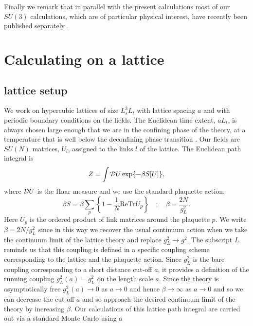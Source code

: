 \documentclass[12pt]{article}
\begin{document}
Finally we remark that in parallel with the present calculations most of our $SU(3)$
calculations, which are of particular physical interest, have recently been published
separately 
%
\cite{AAMT-2020}.
%



%
%
%
%
\section{Calculating on a lattice}
\label{section_lattice} 

%
%
\subsection{lattice setup}
\label{subsection_lattice_setup}


We work on hypercubic lattices of size $L_s^3L_t$ with lattice spacing $a$ and with
periodic boundary conditions on the fields. The Euclidean time extent, $aL_t$, is
always chosen large enough that we are in the confining phase of the theory, at a
temperature that is well below the deconfining phase transition
%
\cite{BLMTUW_Tc}.
%
Our fields are $SU(N)$ matrices, $U_l$,
assigned to the links $l$ of the lattice. The Euclidean path integral is 
%
\begin{equation}
Z=\int {\cal{D}}U \exp\{- \beta S[U]\},
\label{eqn_Z}
\end{equation}
%
where ${\cal{D}}U$ is the Haar measure and we use the standard plaquette action,
%
\begin{equation}
\beta S = \beta \sum_p \left\{1-\frac{1}{N} {\text{ReTr}} U_p\right\}  
\quad ; \quad \beta=\frac{2N}{g^2_L}.
\label{eqn_S}
\end{equation}
%
Here $U_p$ is the ordered product of link matrices around the plaquette $p$. We write
$\beta=2N/g^2_L$ since in this way we recover the usual continuum action when we
take the continuum limit of the lattice theory and replace $g^2_L\to g^2$.
The subscript $L$ reminds us that this coupling is defined in a specific coupling
scheme  corresponding to the lattice and the plaquette action. Since $g^2_L$ is the
bare coupling corresponding to a short distance cut-off $a$, it provides a definition
of the running coupling $g^2_L(a)=g^2_L$ on the length scale $a$. Since the theory is
asymptotically free $g^2_L(a)\to 0$ as $a\to 0$ and hence $\beta\to \infty$ as $a\to 0$
and so we can decrease the cut-off
$a$ and so approach the desired continuum limit of the theory by increasing $\beta$. Our
calculations of this lattice path integral are carried out via a standard Monte Carlo using a
\end{document}
